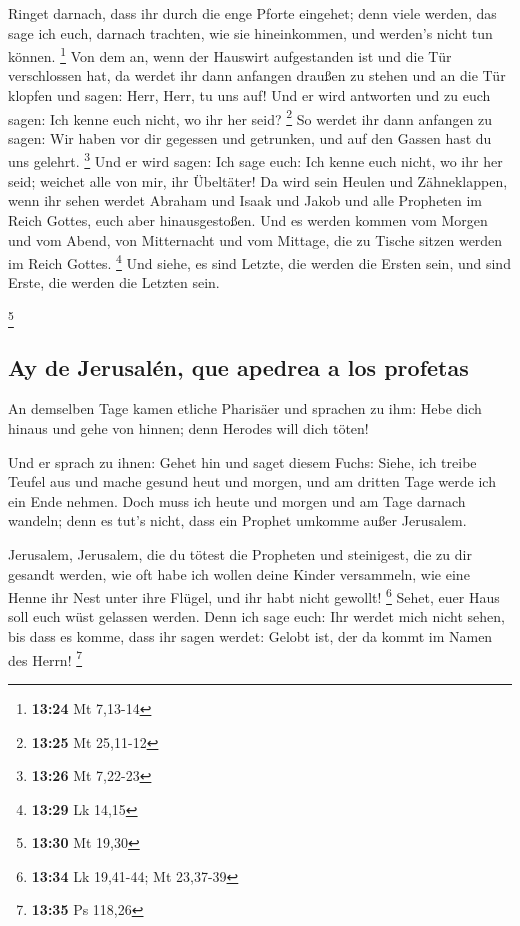  Ringet darnach, dass ihr durch die enge Pforte eingehet;
denn viele werden, das sage ich euch, darnach trachten, wie sie
hineinkommen, und werden's nicht tun können. \footnote{\textbf{13:24} Mt
  7,13-14}  Von dem an, wenn der Hauswirt aufgestanden
ist und die Tür verschlossen hat, da werdet ihr dann anfangen draußen zu
stehen und an die Tür klopfen und sagen: Herr, Herr, tu uns auf! Und er
wird antworten und zu euch sagen: Ich kenne euch nicht, wo ihr her seid?
\footnote{\textbf{13:25} Mt 25,11-12}  So werdet ihr dann
anfangen zu sagen: Wir haben vor dir gegessen und getrunken, und auf den
Gassen hast du uns gelehrt. \footnote{\textbf{13:26} Mt 7,22-23}
 Und er wird sagen: Ich sage euch: Ich kenne euch nicht,
wo ihr her seid; weichet alle von mir, ihr Übeltäter!  Da
wird sein Heulen und Zähneklappen, wenn ihr sehen werdet Abraham und
Isaak und Jakob und alle Propheten im Reich Gottes, euch aber
hinausgestoßen.  Und es werden kommen vom Morgen und vom
Abend, von Mitternacht und vom Mittage, die zu Tische sitzen werden im
Reich Gottes. \footnote{\textbf{13:29} Lk 14,15}  Und
siehe, es sind Letzte, die werden die Ersten sein, und sind Erste, die
werden die Letzten sein.

\footnote{\textbf{13:30} Mt 19,30}

\hypertarget{ay-de-jerusaluxe9n-que-apedrea-a-los-profetas}{%
\subsection{Ay de Jerusalén, que apedrea a los
profetas}\label{ay-de-jerusaluxe9n-que-apedrea-a-los-profetas}}

 An demselben Tage kamen etliche Pharisäer und sprachen
zu ihm: Hebe dich hinaus und gehe von hinnen; denn Herodes will dich
töten!

 Und er sprach zu ihnen: Gehet hin und saget diesem
Fuchs: Siehe, ich treibe Teufel aus und mache gesund heut und morgen,
und am dritten Tage werde ich ein Ende nehmen.  Doch muss
ich heute und morgen und am Tage darnach wandeln; denn es tut's nicht,
dass ein Prophet umkomme außer Jerusalem.

 Jerusalem, Jerusalem, die du tötest die Propheten und
steinigest, die zu dir gesandt werden, wie oft habe ich wollen deine
Kinder versammeln, wie eine Henne ihr Nest unter ihre Flügel, und ihr
habt nicht gewollt! \footnote{\textbf{13:34} Lk 19,41-44; Mt 23,37-39}
 Sehet, euer Haus soll euch wüst gelassen werden. Denn
ich sage euch: Ihr werdet mich nicht sehen, bis dass es komme, dass ihr
sagen werdet: Gelobt ist, der da kommt im Namen des Herrn! \footnote{\textbf{13:35}
  Ps 118,26}

